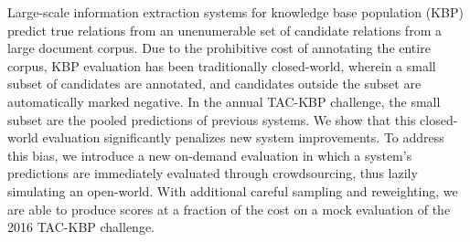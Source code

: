 Large-scale information extraction systems for knowledge base population (KBP)
predict true relations from an unenumerable set of candidate relations from a large document corpus.
Due to the prohibitive cost of annotating the entire corpus,
KBP evaluation has been traditionally closed-world,
wherein a small subset of candidates are annotated, %
and candidates outside the subset are automatically marked negative.
In the annual TAC-KBP challenge, the small subset are the pooled predictions of previous systems.
We show that this closed-world evaluation significantly penalizes new system improvements.
To address this bias,
we introduce a new on-demand evaluation in which a system's predictions are immediately evaluated through crowdsourcing,
thus lazily simulating an open-world.
With additional careful sampling and reweighting,
we are able to produce scores at a fraction of the cost on a mock evaluation of the 2016 TAC-KBP challenge.



